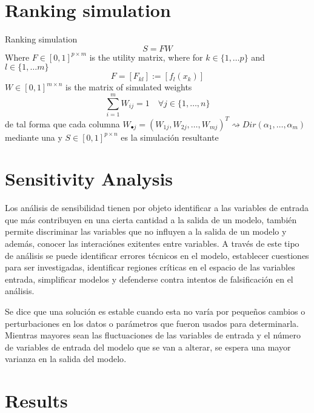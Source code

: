 \section{Ranking simulation}
Ranking simulation
\[ S = F W \]
Where $F\in[0,1]^{p\times m}$ is the utility matrix, where for $k\in\{1,\ldots p\}$ and
$l\in\{1,\ldots m\}$
\[ F = [F_{kl}] := [f_l(x_k)] \]
$W\in[0,1]^{m\times n}$ is the matrix of simulated weights
\[ \sum_{i=1}^m W_{ij} = 1 \quad \forall j\in\{1,\ldots,n\}\]
de tal forma que cada columna $W_{\bullet j} = (W_{1j},W_{2j},\ldots,W_{mj})^T\rightsquigarrow
Dir(\alpha_1,\ldots,\alpha_m)$ mediante una
y $S\in[0,1]^{p\times n}$ es la simulación resultante


\section{Sensitivity Analysis}
Los análisis de sensibilidad tienen por objeto identificar a las variables de entrada que más contribuyen en una cierta cantidad a la salida de un modelo, también permite discriminar las variables que no influyen a la salida de un modelo y además, conocer las interaciónes exitentes entre variables\citep{4}. A través de este tipo de análisis se puede identificar errores técnicos en el modelo, establecer cuestiones para ser investigadas, identificar regiones críticas en el espacio de las variables entrada, simplificar modelos y defenderse contra intentos de falsificación en el análisis\citep{5}. 

Se dice que una solución es estable cuando esta no varía por pequeños cambios o perturbaciones en los datos o parámetros que fueron usados para determinarla\citep{2}. Mientras mayores sean las fluctuaciones de las variables de entrada y el número de variables de entrada del modelo que se van a alterar, se espera una mayor varianza en la salida del modelo\citep{5}.    


\section{Results}


